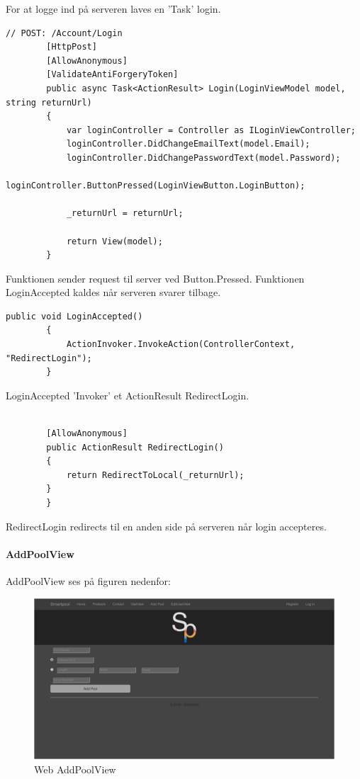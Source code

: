 For at logge ind på serveren laves en 'Task' login.

\begin{lstlisting}[caption=Login, label=code:Login]
 // POST: /Account/Login
        [HttpPost]
        [AllowAnonymous]
        [ValidateAntiForgeryToken]
        public async Task<ActionResult> Login(LoginViewModel model, string returnUrl)
        {
            var loginController = Controller as ILoginViewController;
            loginController.DidChangeEmailText(model.Email);
            loginController.DidChangePasswordText(model.Password);
            loginController.ButtonPressed(LoginViewButton.LoginButton);

            _returnUrl = returnUrl;

            return View(model);
        }
\end{lstlisting} 

Funktionen sender request til server ved Button.Pressed. Funktionen LoginAccepted kaldes når serveren svarer tilbage.

\begin{lstlisting}[caption=LoginAccepted, label=code:LoginAccepted]
public void LoginAccepted()
        {
            ActionInvoker.InvokeAction(ControllerContext, "RedirectLogin");
        }
\end{lstlisting}

LoginAccepted 'Invoker' et ActionResult RedirectLogin.
 
 \begin{lstlisting}[caption=Redirect Login, label=code:redirectlogin]

        [AllowAnonymous]
        public ActionResult RedirectLogin()
        {
            return RedirectToLocal(_returnUrl);
        }
        }
\end{lstlisting}

RedirectLogin redirects til en anden side på serveren når login accepteres.

\paragraph{AddPoolView}
AddPoolView ses på figuren nedenfor:

\begin{figure}
	\centering
	\includegraphics[width=1.0\linewidth]{figs/implementering/web_addpoolview}
	\caption{Web AddPoolView}
	\label{fig:webaddpoolview}
\end{figure}

